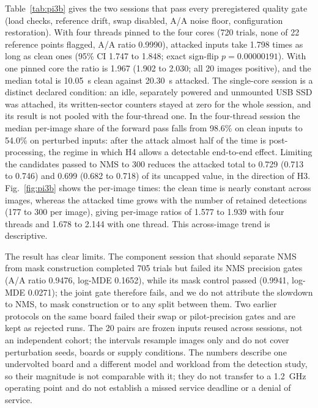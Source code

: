 \documentclass[a4paper,fleqn]{cas-dc}
\begin{document}
Table~\ref{tab:pi3b} gives the two sessions that pass every preregistered quality gate (load checks, reference drift, swap disabled, A/A noise floor, configuration restoration). With four threads pinned to the four cores (720 trials, none of 22 reference points flagged, A/A ratio 0.9990), attacked inputs take 1.798 times as long as clean ones (95\% CI 1.747 to 1.848; exact sign-flip $p=0.00000191$). With one pinned core the ratio is 1.967 (1.902 to 2.030; all 20 images positive), and the median total is 10.05~s clean against 20.30~s attacked. The single-core session is a distinct declared condition: an idle, separately powered and unmounted USB SSD was attached, its written-sector counters stayed at zero for the whole session, and its result is not pooled with the four-thread one. In the four-thread session the median per-image share of the forward pass falls from 98.6\% on clean inputs to 54.0\% on perturbed inputs: after the attack almost half of the time is post-processing, the regime in which H4 allows a detectable end-to-end effect. Limiting the candidates passed to NMS to 300 reduces the attacked total to 0.729 (0.713 to 0.746) and 0.699 (0.682 to 0.718) of its uncapped value, in the direction of H3. Fig.~\ref{fig:pi3b} shows the per-image times: the clean time is nearly constant across images, whereas the attacked time grows with the number of retained detections (177 to 300 per image), giving per-image ratios of 1.577 to 1.939 with four threads and 1.678 to 2.144 with one thread. This across-image trend is descriptive.

The result has clear limits. The component session that should separate NMS from mask construction completed 705 trials but failed its NMS precision gates (A/A ratio 0.9476, log-MDE 0.1652), while its mask control passed (0.9941, log-MDE 0.0271); the joint gate therefore fails, and we do not attribute the slowdown to NMS, to mask construction or to any split between them. Two earlier protocols on the same board failed their swap or pilot-precision gates and are kept as rejected runs. The 20 pairs are frozen inputs reused across sessions, not an independent cohort; the intervals resample images only and do not cover perturbation seeds, boards or supply conditions. The numbers describe one undervolted board and a different model and workload from the detection study, so their magnitude is not comparable with it; they do not transfer to a 1.2~GHz operating point and do not establish a missed service deadline or a denial of service.
\end{document}
